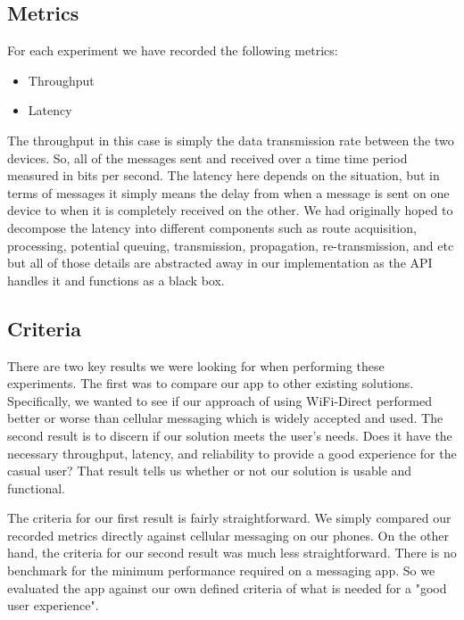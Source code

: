 \documentclass[10pt]{article}
\begin{document}
\subsection{Metrics}

For each experiment we have recorded the following metrics:
\begin{itemize}
    \item Throughput
    \item Latency
\end{itemize}
The throughput in this case is simply the data transmission rate between the two devices. So, all of the messages sent and received over a time time period measured in bits per second. The latency here depends on the situation, but in terms of messages it simply means the delay from when a message is sent on one device to when it is completely received on the other. We had originally hoped to decompose the latency into different components such as route acquisition, processing, potential queuing, transmission, propagation, re-transmission, and etc but all of those details are abstracted away in our implementation as the API handles it and functions as a black box.

\subsection{Criteria}

There are two key results we were looking for when performing these experiments. The first was to compare our app to other existing solutions. Specifically, we wanted to see if our approach of using WiFi-Direct performed better or worse than cellular messaging which is widely accepted and used. The second result is to discern if our solution meets the user's needs. Does it have the necessary throughput, latency, and reliability to provide a good experience for the casual user? That result tells us whether or not our solution is usable and functional.

The criteria for our first result is fairly straightforward. We simply compared our recorded metrics directly against cellular messaging on our phones. On the other hand, the criteria for our second result was much less straightforward. There is no benchmark for the minimum performance required on a messaging app. So we evaluated the app against our own defined criteria of what is needed for a "good user experience".
\end{document}
